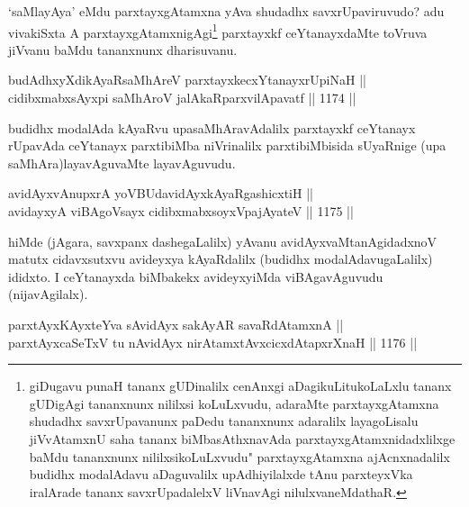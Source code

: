\begin{artha}
`saMlayAya' eMdu parxtayxgAtamxna yAva shudadhx savxrUpaviruvudo? adu vivakiSxta A parxtayxgAtamxnigAgi\footnote{giDugavu punaH tananx gUDinalilx cenAnxgi aDagikuLitukoLaLxlu tananx gUDigAgi tananxnunx nililxsi koLuLxvudu, adaraMte parxtayxgAtamxna shudadhx savxrUpavanunx paDedu tananxnunx adaralilx layagoLisalu jiVvAtamxnU saha tananx biMbasAthxnavAda parxtayxgAtamxnidadxlilxge baMdu tananxnunx nililxsikoLuLxvudu" parxtayxgAtamxna ajAcnxnadalilx budidhx modalAdavu aDaguvalilx upAdhiyilalxde tAnu parxteyxVka iralArade tananx savxrUpadalelxV liVnavAgi nilulxvaneMdathaR.} parxtayxkf ceYtanayxdaMte toVruva jiVvanu baMdu tananxnunx dharisuvanu.
\end{artha}


\begin{shl}
budAdhxyXdikAyaRsaMhAreV parxtayxkecxYtanayxrUpiNaH || \\
cidibxmabxsAyxpi saMhAroV jalAkaRparxvilApavatf \hfill || 1174 ||  
\end{shl}

\begin{artha}
budidhx modalAda kAyaRvu upasaMhAravAdalilx parxtayxkf ceYtanayx rUpavAda ceYtanayx parxtibiMba niVrinalilx parxtibiMbisida sUyaRnige (upa saMhAra)layavAguvaMte layavAguvudu.
\end{artha}


\begin{shl}
avidAyxvAnupxrA yoV\s BUdavidAyxkAyaRgashicxtiH || \\
avidayxyA viBAgoV\s sayx cidibxmabxsoyxVpajAyateV \hfill || 1175 ||  
\end{shl}

\begin{artha}
hiMde (jAgara, savxpanx dashegaLalilx) yAvanu avidAyxvaMtanAgidadxnoV matutx cidavxsutxvu avideyxya kAyaRdalilx (budidhx modalAdavugaLalilx) ididxto. I ceYtanayxda biMbakekx avideyxyiMda viBAgavAguvudu (nijavAgilalx).
\end{artha}

\begin{shl}
parxtAyxKAyxteYva sA\s vidAyx sakAyAR savaRdA\s \s tamxnA || \\
parxtAyxcaSeTxV tu nAvidAyx nirAtamxtAvxcicxdAtapxrXnaH \hfill || 1176 ||  
\end{shl}

